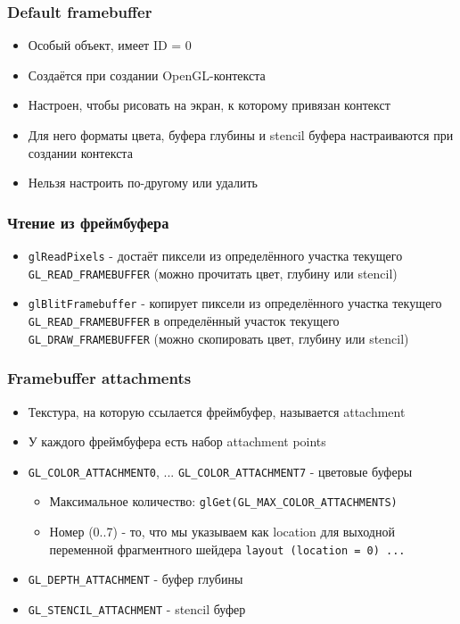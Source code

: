 \documentclass{beamer}
\begin{document}
\begin{frame}[fragile]
\frametitle{Default framebuffer}
\begin{itemize}
\item Особый объект, имеет ID = 0
\pause
\item Создаётся при создании OpenGL-контекста
\pause
\item Настроен, чтобы рисовать на экран, к которому привязан контекст
\pause
\item Для него форматы цвета, буфера глубины и stencil буфера настраиваются при создании контекста
\pause
\item Нельзя настроить по-другому или удалить
\end{itemize}
\end{frame}

\begin{frame}[fragile]
\frametitle{Чтение из фреймбуфера}
\begin{itemize}
\item \verb|glReadPixels| - достаёт пиксели из определённого участка текущего \verb|GL_READ_FRAMEBUFFER| (можно прочитать цвет, глубину или stencil)
\pause
\item \verb|glBlitFramebuffer| - копирует пиксели из определённого участка текущего \verb|GL_READ_FRAMEBUFFER| в определённый участок текущего \verb|GL_DRAW_FRAMEBUFFER| (можно скопировать цвет, глубину или stencil)
\end{itemize}
\end{frame}

\begin{frame}[fragile]
\frametitle{Framebuffer attachments}
\begin{itemize}
\item Текстура, на которую ссылается фреймбуфер, называется attachment
\pause
\item У каждого фреймбуфера есть набор attachment points
\pause
\item \verb|GL_COLOR_ATTACHMENT0|, ... \verb|GL_COLOR_ATTACHMENT7| - цветовые буферы
\pause
\begin{itemize}
\item Максимальное количество: \verb|glGet(GL_MAX_COLOR_ATTACHMENTS)|
\item Номер (0..7) - то, что мы указываем как location для выходной переменной фрагментного шейдера \verb|layout (location = 0) ...|
\end{itemize}
\pause
\item \verb|GL_DEPTH_ATTACHMENT| - буфер глубины
\item \verb|GL_STENCIL_ATTACHMENT| - stencil буфер
\end{itemize}
\end{frame}
\end{document}

